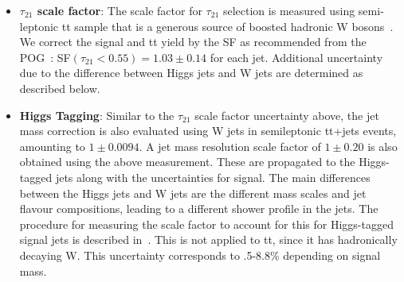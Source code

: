 \begin{itemize}

\item \textbf{$\tau_{21}$ scale factor}: The scale factor for $\tau_{21}$ selection is measured using semi-leptonic tt sample that is a generous source of boosted hadronic W bosons~\cite{CMS-AN-17-051}. We correct the signal and tt yield by the SF as recommended from the POG~\cite{Wtagging}: SF$(\tau_{21} < 0.55) = 1.03 \pm 0.14$ for each jet. Additional uncertainty due to the difference between Higgs jets and W jets are determined as described below.
  
\item \textbf{Higgs Tagging}: Similar to the $\tau_{21}$ scale factor uncertainty above, the jet mass correction is also evaluated using W jets in semileptonic tt+jets events, amounting to $1 \pm 0.0094$. A jet mass resolution scale factor of $1 \pm 0.20$ is also obtained using the above measurement. These are propagated to the Higgs-tagged jets along with the uncertainties for signal.
The main differences between the Higgs jets and W jets are the different mass scales and jet flavour compositions, leading to a different shower profile in the jets. The procedure for measuring the scale factor to account for this for Higgs-tagged signal jets is described in~\cite{CMS-PAS-B2G-16-026}.
This is not applied to tt, since it has hadronically decaying W. This uncertainty corresponds to .5-8.8\% depending on signal mass.


\end{itemize}
